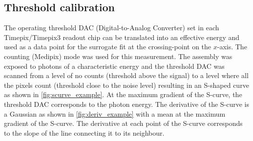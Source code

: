 \subsection{Threshold calibration} \label{sec:threshold}


The operating threshold DAC (Digital-to-Analog Converter) set in each
Timepix/Timepix3 readout chip can be translated into an effective
energy and used as a data point for the surrogate fit at the
crossing-point on the $x$-axis. The counting (Medipix) mode was used
for this measurement. The assembly was exposed to photons of a
characteristic energy and the threshold DAC was scanned from a level
of no counts (threshold above the signal) to a level where all the
pixels count (threshold close to the noise level) resulting in an
S-shaped curve as shown in \cref{fig:scurve_example}. At the
maximum gradient of the S-curve, the threshold DAC corresponds to the
photon energy. The derivative of the S-curve is a Gaussian as shown in
\cref{fig:deriv_example} with a mean at the maximum gradient of
the S-curve. The derivative at each point of the S-curve corresponds
to the slope of the line connecting it to its neighbour.

